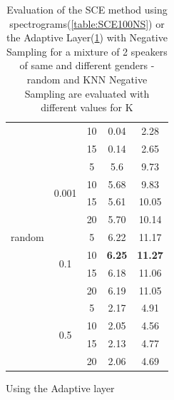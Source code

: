 \documentclass[master, tikz, final,11pt, dvipdfmx]{iscs-thesis}
\begin{document}
\begin{table}[h!]
\begin{subtable}{.5\linewidth}
\begin{tabular}{l|c|c|c|c}
\cline{3-5}
 &  & 10 & 0.04 & 2.28 \\
\cline{3-5}
 &  & 15 & 0.14 & 2.65 \\
\hline
\multirow{9}{*}{random}  & \multirow{4}{*}{0.001} & 5 & 5.6 & 9.73 \\ 
\cline{3-5}
 &  & 10 & 5.68 & 9.83 \\
\cline{3-5}
 &  & 15 & 5.61 & 10.05 \\
\cline{3-5}
 &  & 20 & 5.70 & 10.14 \\
\cline{2-5}
 & \multirow{4}{*}{0.1} & 5 & 6.22 & 11.17 \\
\cline{3-5}
 &  & 10 & \textbf{6.25} & \textbf{11.27} \\
\cline{3-5}
 &  & 15 & 6.18 & 11.06 \\
\cline{3-5}
 &  & 20 & 6.19 & 11.05 \\
\cline{2-5}
 & \multirow{4}{*}{0.5} & 5 & 2.17 & 4.91 \\
\cline{3-5}
 &  & 10 & 2.05 & 4.56 \\
\cline{3-5}
 &  & 15 & 2.13 & 4.77 \\
\cline{3-5}
 &  & 20 & 2.06 & 4.69 \\
\end{tabular}
\caption{Using the Adaptive layer}
\label{table:ADAPTSCENS}
\end{subtable}
\caption{Evaluation of the SCE method using spectrograms(\ref{table:SCE100NS}) or the Adaptive Layer(\ref{table:ADAPTSCENS}) with Negative Sampling for a mixture of 2 speakers of same and different genders - random and KNN Negative Sampling are evaluated with different values for K}
\end{table}
\end{document}
